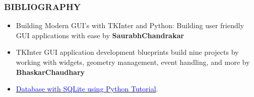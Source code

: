 \documentclass{beamer}
\begin{document}
\begin{frame}
    \frametitle{BIBLIOGRAPHY}
     \begin{itemize}
        \small\item Building Modern GUI's with TKInter and Python: Building user friendly GUI applications with ease by \textbf{SaurabhChandrakar}\\[10pt]
        
        \small\item TKInter GUI application development blueprints build nine projects by working with widgets, geometry management, event handling, and  more by \textbf{BhaskarChaudhary}\\[10pt]
        \item\href{https://www.researchgate.net/publication/340938646_Databases_with_SQlite_using_Python_Tutorial}{\textcolor{blue}{Database with SQLite using Python Tutorial}}.
        \end{itemize}

\end{frame}
\end{document}
